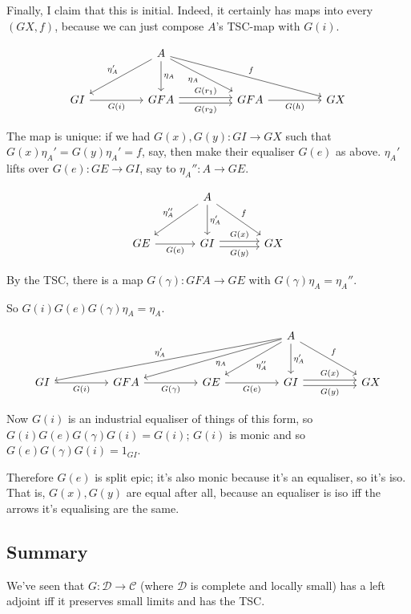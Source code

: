\documentclass[11pt]{amsart}
\begin{document}
Finally, I claim that this is initial. Indeed, it certainly has maps into every $(GX, f)$, because we can just compose $A$'s TSC-map with $G(i)$.

\[
\begin{tikzcd}[row sep=large, column sep=huge]
& A
    \arrow[dl, "\eta'_A"']
    \arrow[d, "\eta_A"]
    \arrow[dr, "\eta_A"']
    \arrow[drr, "f"]
&
&
\\
GI
    \arrow[r, "G(i)"']
& GFA
    \arrow[r, shift left, "G(r_1)"]
    \arrow[r, shift right, "G(r_2)"']
& GFA
    \arrow[r, "G(h)"']
& GX
\end{tikzcd}
\]

The map is unique: if we had $G(x), G(y): GI \to GX$ such that $G(x)\eta_A' = G(y) \eta_A' = f$, say, then make their equaliser $G(e)$ as above.
$\eta_A'$ lifts over $G(e): GE \to GI$, say to $\eta_A'': A \to GE$.

\[
\begin{tikzcd}[row sep=large, column sep=large]
& A
    \arrow[dl, "\eta''_A"']
    \arrow[dr, "f"]
    \arrow[d, "\eta'_A"]
&
\\
GE
    \arrow[r, "G(e)"']
& GI
    \arrow[r, shift left, "G(x)"]
    \arrow[r, shift right, "G(y)"']
& GX
\end{tikzcd}
\]

By the TSC, there is a map $G(\gamma) : GFA \to GE$ with $G(\gamma) \eta_A = \eta_A''$.

So $G(i) G(e) G(\gamma) \eta_A = \eta_A$.

\[
\begin{tikzcd}[row sep=large, column sep=huge]
& & & A
    \arrow[dlll, "\eta'_A"']
    \arrow[dll, "\eta_A"]
    \arrow[dl, "\eta''_A"]
    \arrow[d, "\eta'_A"]
    \arrow[dr, "f"]
&
\\
GI
    \arrow[r, "G(i)"']
& GFA
    \arrow[r, "G(\gamma)"']
& GE
    \arrow[r, "G(e)"']
& GI
    \arrow[r, shift left, "G(x)"]
    \arrow[r, shift right, "G(y)"']
& GX
\end{tikzcd}
\]

Now $G(i)$ is an industrial equaliser of things of this form, so $G(i) G(e) G(\gamma) G(i) = G(i)$; $G(i)$ is monic and so $G(e) G(\gamma) G(i) = 1_{GI}$.

Therefore $G(e)$ is split epic; it's also monic because it's an equaliser, so it's iso.
That is, $G(x), G(y)$ are equal after all, because an equaliser is iso iff the arrows it's equalising are the same.

\subsection{Summary}
We've seen that $G: \mathcal{D} \to \mathcal{C}$ (where $\mathcal{D}$ is complete and locally small) has a left adjoint iff it preserves small limits and has the TSC.
\end{document}
